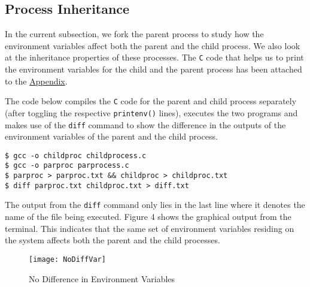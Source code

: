 \documentclass[a4paper,12pt]{article}
\begin{document}
\subsection{Process Inheritance}
{\par \noindent In the current subsection, we fork the parent process to study how the environment variables affect both the parent and the child process. We also look at the inheritance properties of these processes. The \texttt{C} code that helps us to print the environment variables for the child and the parent process has been attached to the \hyperref[Appsec:3.2]{Appendix}.\\}
{\par \noindent The code below compiles the \texttt{C} code for the parent and child process separately (after toggling the respective \texttt{printenv()} lines), executes the two programs and makes use of the \texttt{diff} command to show the difference in the outputs of the environment variables of the parent and the child process.}
\begin{verbatim}
$ gcc -o childproc childprocess.c
$ gcc -o parproc parprocess.c
$ parproc > parproc.txt && childproc > childproc.txt
$ diff parproc.txt childproc.txt > diff.txt
\end{verbatim}
The output from the \texttt{diff} command only lies in the last line where it denotes the name of the file being executed. Figure 4 shows the graphical output from the terminal. This indicates that the same set of environment variables residing on the system affects both the parent and the child processes.
\begin{figure}[H]
	\centering
	\texttt{[image: NoDiffVar]}
	\caption{No Difference in Environment Variables}
	\label{fig:nodiffvar}
\end{figure}
\end{document}
